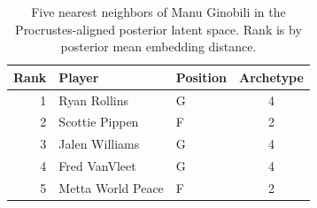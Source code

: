 \begin{table}[htbp]
  \centering\small
  \begin{tabular}{rllc}
    \toprule
    Rank & Player & Position & Archetype \\
    \midrule
    1 & Ryan Rollins & G & 4 \\
    2 & Scottie Pippen & F & 2 \\
    3 & Jalen Williams & G & 4 \\
    4 & Fred VanVleet & G & 4 \\
    5 & Metta World Peace & F & 2 \\
    \bottomrule
  \end{tabular}
  \caption{Five nearest neighbors of Manu Ginobili in the Procrustes-aligned posterior latent space. Rank is by posterior mean embedding distance.}
  \label{tab:Manu_Ginobili_neighbors}
\end{table}

